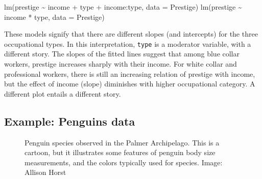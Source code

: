 \documentclass[
  letterpaper,
  10pt,
  krantz2]{krantz}
\makeatletter
\newenvironment{Shaded}{\begin{snugshade}}{\end{snugshade}}
\newcommand{\AttributeTok}[1]{\textcolor[rgb]{0.40,0.45,0.13}{#1}}
\newcommand{\FunctionTok}[1]{\textcolor[rgb]{0.28,0.35,0.67}{#1}}
\newcommand{\NormalTok}[1]{\textcolor[rgb]{0.00,0.23,0.31}{#1}}
\newcommand{\SpecialCharTok}[1]{\textcolor[rgb]{0.37,0.37,0.37}{#1}}
\newenvironment{kframe}{%
  \medskip{}
  \setlength{\fboxsep}{.8em}
  \def\at@end@of@kframe{}%
  \ifinner\ifhmode%
  \def\at@end@of@kframe{\end{minipage}}%
  \begin{minipage}{\columnwidth}%
  \fi\fi%
  \def\FrameCommand##1{\hskip\@totalleftmargin \hskip-\fboxsep
  \colorbox{shadecolor}{##1}\hskip-\fboxsep
      \hskip-\linewidth \hskip-\@totalleftmargin \hskip\columnwidth}%
  \MakeFramed {\advance\hsize-\width
    \@totalleftmargin\z@ \linewidth\hsize
    \@setminipage}}%
{\par\unskip\endMakeFramed%
  \at@end@of@kframe}
\renewenvironment{Shaded}{\begin{kframe}}{\end{kframe}}
\makeatother
\begin{document}
\begin{Shaded}
\begin{Highlighting}[]
\FunctionTok{lm}\NormalTok{(prestige }\SpecialCharTok{\textasciitilde{}}\NormalTok{ income }\SpecialCharTok{+}\NormalTok{ type }\SpecialCharTok{+}\NormalTok{ income}\SpecialCharTok{:}\NormalTok{type, }\AttributeTok{data =}\NormalTok{ Prestige)}
\FunctionTok{lm}\NormalTok{(prestige }\SpecialCharTok{\textasciitilde{}}\NormalTok{ income }\SpecialCharTok{*}\NormalTok{ type, }\AttributeTok{data =}\NormalTok{ Prestige)}
\end{Highlighting}
\end{Shaded}

These models signify that there are different slopes (and intercepts)
for the three occupational types. In this interpretation, \texttt{type}
is a moderator variable, with a different story. The slopes of the
fitted lines suggest that among blue collar workers, prestige increases
sharply with their income. For white collar and professional workers,
there is still an increasing relation of prestige with income, but the
effect of income (slope) diminishes with higher occupational category. A
different plot entails a different story.

\subsection{Example: Penguins data}\label{sec-penguins}

\begin{figure}


\caption{\label{fig-penguin-species}Penguin species observed in the
Palmer Archipelago. This is a cartoon, but it illustrates some features
of penguin body size measurements, and the colors typically used for
species. Image: Allison Horst}

\end{figure}%
\end{document}
